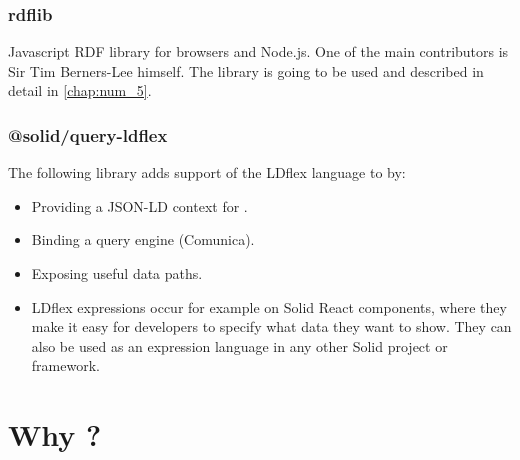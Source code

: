 \subsubsection{rdflib}

Javascript RDF library for browsers and Node.js. One of the main contributors is Sir Tim Berners-Lee himself. The library is going to be used and described in detail in \autoref{chap:num_5}.

\subsubsection{@solid/query-ldflex}

The following library adds support of the LDflex language to \solid{} by:

\begin{itemize}
	\item Providing a JSON-LD context for \solid{}.
    \item Binding a query engine (Comunica).
    \item Exposing useful data paths.
    \item LDflex expressions occur for example on Solid React components, where they make it easy for developers to specify what data they want to show. They can also be used as an expression language in any other Solid project or framework.
\end{itemize}

\section{Why \solid{}?}

